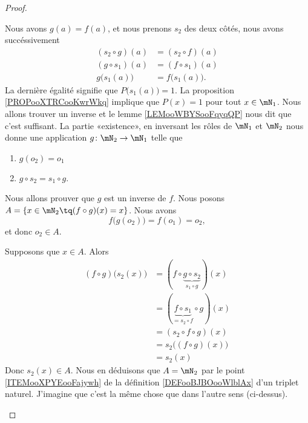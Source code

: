 \begin{proof}
\begin{subproof}
		Nous avons \( g(a)=f(a)\), et nous prenons \( s_2\) des deux côtés, nous avons succéssivement
		\begin{subequations}
			\begin{align}
				(s_2\circ g)(a)     & =(s_2\circ f)(a)      \\
				(g\circ s_1)(a)     & =(f\circ s_1)(a)      \\
				g\big( s_1(a) \big) & =f\big( s_1(a) \big).
			\end{align}
		\end{subequations}
		La dernière égalité signifie que \( P\big( s_1(a) \big)=1\). La proposition \ref{PROPooXTRCooKwrWkq} implique que \( P(x)=1\) pour tout \( x\in \mN_1\).
		Nous allons trouver un inverse et le lemme \ref{LEMooWBYSooFqyqQP} nous dit que c'est suffisant. La partie «existence», en inversant les rôles de \( \mN_1\) et \( \mN_2\) nous donne une application \( g\colon \mN_2\to \mN_1\) telle que
		\begin{enumerate}
			\item
			      \( g(o_2)=o_1\)
			\item
			      \( g\circ s_2=s_1\circ g\).
		\end{enumerate}
		Nous allons prouver que \( g\) est un inverse de \( f\).
		\spitem[\( f\circ g=\id\)]
		Nous posons \( A=\{ x\in \mN_2\tq (f\circ g)(x)=x \}\). Nous avons
		\begin{equation}
			f\big( g(o_2) \big)=f(o_1)=o_2,
		\end{equation}
		et donc \( o_2\in A\).

		Supposons que \( x\in A\). Alors
		\begin{subequations}
			\begin{align}
				(f\circ g)\big( s_2(x) \big) & =(f\circ \underbrace{g\circ s_2}_{s_1\circ g})(x)  \\
				                             & =(\underbrace{f\circ s_1}_{=s_2\circ f}\circ g)(x) \\
				                             & =(s_2\circ f\circ g)(x)                            \\
				                             & =s_2\big( (f\circ g)(x) \big)                      \\
				                             & =s_2(x)
			\end{align}
		\end{subequations}
		Donc \( s_2(x)\in A\). Nous en déduisons que \( A=\mN_2\) par le point \ref{ITEMooXPYEooFajywh} de la définition \ref{DEFooBJBOooWlblAx} d'un triplet naturel.
		\spitem[\( g\circ f=\id\)]
		J'imagine que c'est la même chose que dans l'autre sens (ci-dessus).
	\end{subproof}
\end{proof}

